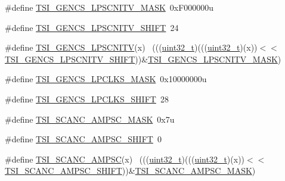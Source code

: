 \begin{DoxyCompactItemize}
\item 
\#define \hyperlink{group___t_s_i___register___masks_gaf89fb1d534403dbb1be0df6093c0d529}{T\+S\+I\+\_\+\+G\+E\+N\+C\+S\+\_\+\+L\+P\+S\+C\+N\+I\+T\+V\+\_\+\+M\+A\+SK}~0x\+F000000u
\item 
\#define \hyperlink{group___t_s_i___register___masks_ga925b30be99db125b6524ede3ef7af689}{T\+S\+I\+\_\+\+G\+E\+N\+C\+S\+\_\+\+L\+P\+S\+C\+N\+I\+T\+V\+\_\+\+S\+H\+I\+FT}~24
\item 
\#define \hyperlink{group___t_s_i___register___masks_gade959d31be4b537f59b115fbd4ca988a}{T\+S\+I\+\_\+\+G\+E\+N\+C\+S\+\_\+\+L\+P\+S\+C\+N\+I\+TV}(x)                                    ~(((\hyperlink{_p_e___types_8h_a33594304e786b158f3fb30289278f5af}{uint32\+\_\+t})(((\hyperlink{_p_e___types_8h_a33594304e786b158f3fb30289278f5af}{uint32\+\_\+t})(x))$<$$<$\hyperlink{group___t_s_i___register___masks_ga925b30be99db125b6524ede3ef7af689}{T\+S\+I\+\_\+\+G\+E\+N\+C\+S\+\_\+\+L\+P\+S\+C\+N\+I\+T\+V\+\_\+\+S\+H\+I\+FT}))\&\hyperlink{group___t_s_i___register___masks_gaf89fb1d534403dbb1be0df6093c0d529}{T\+S\+I\+\_\+\+G\+E\+N\+C\+S\+\_\+\+L\+P\+S\+C\+N\+I\+T\+V\+\_\+\+M\+A\+SK})
\item 
\#define \hyperlink{group___t_s_i___register___masks_ga10761aaf1cd7148018bd3ae41583e66c}{T\+S\+I\+\_\+\+G\+E\+N\+C\+S\+\_\+\+L\+P\+C\+L\+K\+S\+\_\+\+M\+A\+SK}~0x10000000u
\item 
\#define \hyperlink{group___t_s_i___register___masks_ga620a7a5a90382cea065b1498ff7a41ed}{T\+S\+I\+\_\+\+G\+E\+N\+C\+S\+\_\+\+L\+P\+C\+L\+K\+S\+\_\+\+S\+H\+I\+FT}~28
\item 
\#define \hyperlink{group___t_s_i___register___masks_ga005284b8b7706c54a56d4c88f5974dc9}{T\+S\+I\+\_\+\+S\+C\+A\+N\+C\+\_\+\+A\+M\+P\+S\+C\+\_\+\+M\+A\+SK}~0x7u
\item 
\#define \hyperlink{group___t_s_i___register___masks_ga2dae9d2c84538073c5ef08d391150c97}{T\+S\+I\+\_\+\+S\+C\+A\+N\+C\+\_\+\+A\+M\+P\+S\+C\+\_\+\+S\+H\+I\+FT}~0
\item 
\#define \hyperlink{group___t_s_i___register___masks_ga4b0c2e21de678ed097431bb897d4f73f}{T\+S\+I\+\_\+\+S\+C\+A\+N\+C\+\_\+\+A\+M\+P\+SC}(x)                                          ~(((\hyperlink{_p_e___types_8h_a33594304e786b158f3fb30289278f5af}{uint32\+\_\+t})(((\hyperlink{_p_e___types_8h_a33594304e786b158f3fb30289278f5af}{uint32\+\_\+t})(x))$<$$<$\hyperlink{group___t_s_i___register___masks_ga2dae9d2c84538073c5ef08d391150c97}{T\+S\+I\+\_\+\+S\+C\+A\+N\+C\+\_\+\+A\+M\+P\+S\+C\+\_\+\+S\+H\+I\+FT}))\&\hyperlink{group___t_s_i___register___masks_ga005284b8b7706c54a56d4c88f5974dc9}{T\+S\+I\+\_\+\+S\+C\+A\+N\+C\+\_\+\+A\+M\+P\+S\+C\+\_\+\+M\+A\+SK})

\end{DoxyCompactItemize}
